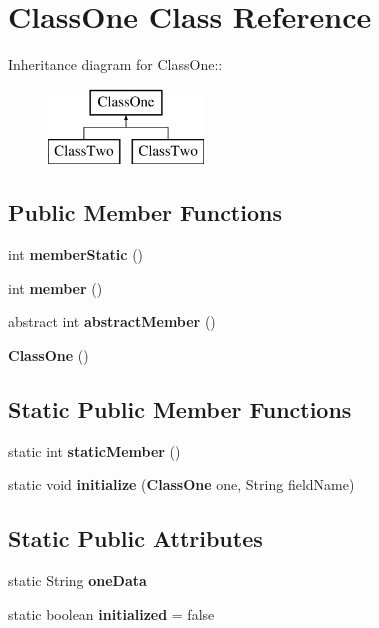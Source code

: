 \section{Class\-One Class Reference}
\label{classClassOne}
Inheritance diagram for Class\-One::\begin{figure}[H]
\begin{center}
\leavevmode
\includegraphics[height=2cm]{classClassOne}
\end{center}
\end{figure}
\subsection*{Public Member Functions}
\begin{CompactItemize}
\item 
int {\bf member\-Static} ()\label{classClassOne_82562b89ee05aaaea678c8d03195c4fa}

\item 
int {\bf member} ()\label{classClassOne_2891d675a1a24cbefb4d137c7a6c5246}

\item 
abstract int {\bf abstract\-Member} ()\label{classClassOne_d4d6e41c525f13b52ac972e78617670f}

\item 
{\bf Class\-One} ()\label{classClassOne_a3e3a578984311bf8d06c453be8e4bf7}

\end{CompactItemize}
\subsection*{Static Public Member Functions}
\begin{CompactItemize}
\item 
static int {\bf static\-Member} ()\label{classClassOne_3dcd89d59ceccfeb86b8d59cb50cac28}

\item 
static void {\bf initialize} ({\bf Class\-One} one, String field\-Name)\label{classClassOne_72359492bd342810d4036c367c6b3c9d}

\end{CompactItemize}
\subsection*{Static Public Attributes}
\begin{CompactItemize}
\item 
static String {\bf one\-Data}\label{classClassOne_b5c7fc191be97409dd14e61c55d30c44}

\item 
static boolean {\bf initialized} = false\label{classClassOne_c0cbceb167235a8176162c91b1799f59}

\end{CompactItemize}
